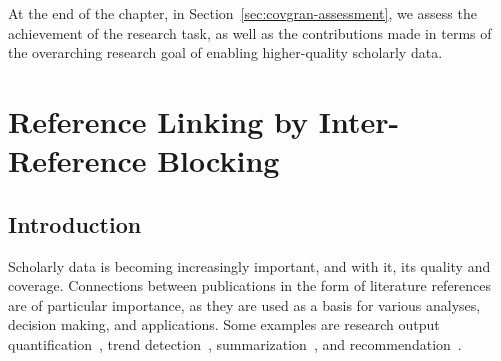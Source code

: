 At the end of the chapter, in Section~\ref{sec:covgran-assessment}, we assess the achievement of the research task, as well as the contributions made in terms of the overarching research goal of enabling higher-quality scholarly data.


\section{Reference Linking by Inter-Reference Blocking}\label{sec:covgran-blocking}

\subsection{Introduction}
Scholarly data is becoming increasingly important, and with it, its quality and coverage. Connections between publications in the form of literature references are of particular importance, as they are used as a basis for various analyses, decision making, and applications. Some examples are research output quantification~\cite{Hirsch2005}, trend detection~\cite{Chen2006}, summarization~\cite{Elkiss2008}, and recommendation~\cite{Ma2020,Faerber2020a}.


